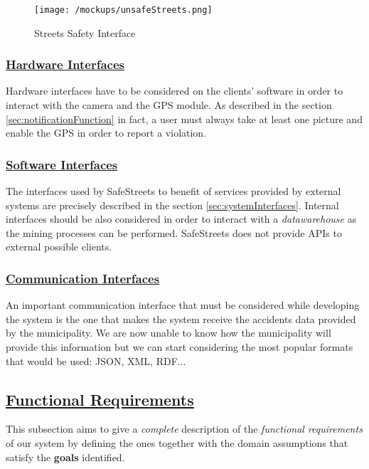	 \begin{figure}[h]
	 	\centering
	 	\begin{minipage}{0.45\textwidth}
	 		\centering
	 		\texttt{[image: /mockups/unsafeStreets.png]}
	 		\caption{Streets Safety Interface}
	 	\end{minipage}
 		\begin{minipage}{0.45\textwidth}
 			
 		\end{minipage}
	 \end{figure} 
 
	\FloatBarrier
	
	\subsubsection[Hardware Interfaces]{\hyperlink{toc}{Hardware Interfaces}}
		Hardware interfaces have to be considered on the clients' software in order to interact with the camera and the GPS module. As described in the section \ref{sec:notificationFunction} in fact, a user must always take at least one picture and enable the GPS in order to report a violation. 
		
	\subsubsection[Software Interfaces]{\hyperlink{toc}{Software Interfaces}}
		The interfaces used by SafeStreets to benefit of services provided by external systems are precisely described in the section \ref{sec:systemInterfaces}. Internal interfaces should be also considered in order to interact with a \emph{datawarehouse} as the mining processes can be performed. SafeStreets does not provide APIs to external possible clients.
		
	\subsubsection[Communication Interfaces]{\hyperlink{toc}{Communication Interfaces}}
		An important communication interface that must be considered while developing the system is the one that makes the system receive the accidents data provided by the municipality. We are now unable to know how the municipality will provide this information but we can start considering the most popular formats that would be used: JSON, XML, RDF... 

\subsection[Functional Requirements]{\hyperlink{toc}{Functional Requirements}}
	\label{sec:functionalRequirements}
	This subsection aims to give a \emph{complete} description of the \emph{functional requirements} of our system by defining the ones together with the domain assumptions that satisfy the \textbf{goals} identified.
	
